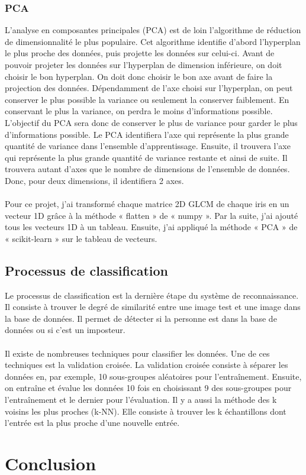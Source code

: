 \documentclass[12pt,twoside,letterpaper]{article}
\begin{document}
\subsubsection{PCA}
L'analyse en composantes principales (PCA) est de loin l'algorithme de réduction de dimensionnalité le plus populaire. Cet algorithme identifie d'abord l'hyperplan le plus proche des données, puis projette les données sur celui-ci. Avant de pouvoir projeter les données sur l’hyperplan de dimension inférieure, on doit choisir le bon hyperplan. On doit donc choisir le bon axe avant de faire la projection des données. Dépendamment de l’axe choisi sur l’hyperplan, on peut conserver le plus possible la variance ou seulement la conserver faiblement. En conservant le plus la variance, on perdra le moins d’informations possible. L’objectif du PCA sera donc de conserver le plus de variance pour garder le plus d’informations possible. Le PCA identifiera l’axe qui représente la plus grande quantité de variance dans l'ensemble d'apprentissage. Ensuite, il trouvera l’axe qui représente la plus grande quantité de variance restante et ainsi de suite. Il trouvera autant d’axes que le nombre de dimensions de l’ensemble de données. Donc, pour deux dimensions, il identifiera 2 axes.
\cite{ref_03}
\\~\\
Pour ce projet, j'ai transformé chaque matrice 2D GLCM de chaque iris en un vecteur 1D grâce à la méthode « flatten » de « numpy ». Par la suite, j'ai ajouté tous les vecteurs 1D à un tableau.  Ensuite, j'ai appliqué la méthode « PCA » de « scikit-learn » sur le tableau de vecteurs.

\subsection{Processus de classification}
Le processus de classification est la dernière étape du système de reconnaissance. Il consiste à trouver le degré de similarité entre une image test et une image dans la base de données. Il permet de détecter si la personne est dans la base de données ou si c’est un imposteur.\cite{ref_01}\cite{ref_06}
\\~\\
Il existe de nombreuses techniques pour classifier les données. Une de ces techniques est la validation croisée. La validation croisée consiste à séparer les données en, par exemple, 10 sous-groupes aléatoires pour l'entraînement. Ensuite, on entraîne et évalue les données 10 fois en choisissant 9 des sous-groupes pour l'entraînement et le dernier pour l'évaluation.\cite{ref_03} Il y a aussi la méthode des k voisins les plus proches (k-NN). Elle consiste à trouver les k échantillons dont l'entrée est la plus proche d'une nouvelle entrée.

\section{Conclusion}

\newpage

\end{document}

